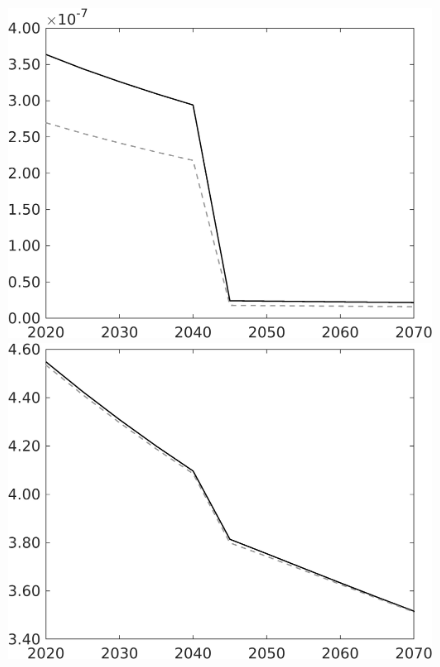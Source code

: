 \begin{figure}[h!!]
\begin{minipage}[]{0.32\textwidth}
\end{minipage}	
\begin{minipage}[]{0.32\textwidth}
\includegraphics[width=1\textwidth]{../../codding_model/own_basedOnFried/optimalPol_010922_revision/figures/all_13Sept22/CompTauf_bytaul_Reg0_gAf_spillover0_nsk0_xgr0_knspil0_sep0_LFlimit1_emsbase0_countec0_GovRev0_etaa0.79_lgd0.png}
\end{minipage}			
\begin{minipage}[]{0.32\textwidth}
\includegraphics[width=1\textwidth]{../../codding_model/own_basedOnFried/optimalPol_010922_revision/figures/all_13Sept22/CompTauf_bytaul_Reg0_gAn_spillover0_nsk0_xgr0_knspil0_sep0_LFlimit1_emsbase0_countec0_GovRev0_etaa0.79_lgd0.png}

\end{minipage}
\end{figure}
